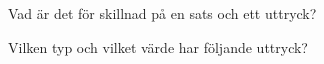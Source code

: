 \Task\Pen Vad är det för skillnad på en sats och ett uttryck?

\Task Vilken typ och vilket värde har följande uttryck? 

\Subtask {}

\Subtask {}

\Subtask {}

\Subtask {}

\Subtask {}

\Subtask {}

\Subtask {}

\Subtask \linebreak[0] 

\Subtask {}

\Subtask {}

\Subtask {}


